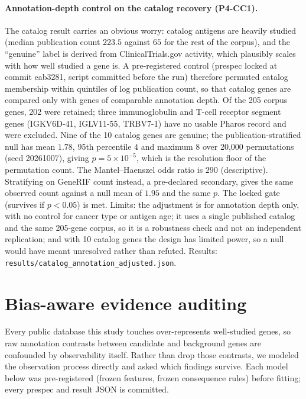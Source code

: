 \documentclass[11pt]{article}
\begin{document}
\paragraph{Annotation-depth control on the catalog recovery (P4-CC1).}
The catalog result carries an obvious worry: catalog antigens are heavily studied
(median publication count $223.5$ against $65$ for the rest of the corpus), and
the ``genuine'' label is derived from ClinicalTrials.gov activity, which plausibly
scales with how well studied a gene is. A pre-registered control (prespec locked
at commit eab3281, script committed before the run) therefore permuted catalog
membership within quintiles of log publication count, so that catalog genes are
compared only with genes of comparable annotation depth. Of the 205 corpus genes,
202 were retained; three immunoglobulin and T-cell receptor segment genes
(IGKV6D-41, IGLV11-55, TRBV7-1) have no usable Pharos record and were excluded.
Nine of the 10 catalog genes are genuine; the publication-stratified null has mean
$1.78$, 95th percentile $4$ and maximum $8$ over 20{,}000 permutations
(seed 20261007), giving $p=5\times10^{-5}$, which is the resolution floor of the
permutation count. The Mantel--Haenszel odds ratio is $290$ (descriptive).
Stratifying on GeneRIF count instead, a pre-declared secondary, gives the same
observed count against a null mean of $1.95$ and the same $p$. The locked gate
(survives if $p<0.05$) is met. Limits: the adjustment is for annotation depth only,
with no control for cancer type or antigen age; it uses a single published catalog
and the same 205-gene corpus, so it is a robustness check and not an independent
replication; and with 10 catalog genes the design has limited power, so a null
would have meant unresolved rather than refuted. Results:
\texttt{results/catalog\_annotation\_adjusted.json}.

\section{Bias-aware evidence auditing}
Every public database this study touches over-represents well-studied genes, so
raw annotation contrasts between candidate and background genes are confounded
by observability itself. Rather than drop those contrasts, we modeled the
observation process directly and asked which findings survive. Each model below
was pre-registered (frozen features, frozen consequence rules) before fitting;
every prespec and result JSON is committed.
\end{document}
